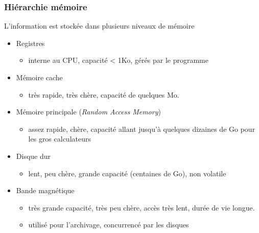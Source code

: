 \begin{frame}
  \frametitle{Hiérarchie mémoire}
  L'information est stockée dans plusieurs niveaux de mémoire
  \begin{itemize}
  \item \alert{Registres}
    \begin{itemize}
    \item interne au CPU, capacité < 1Ko, gérés par le programme
    \end{itemize}
  \item \alert{Mémoire cache}
    \begin{itemize}
    \item très rapide, très chère, capacité de quelques Mo. 
    \end{itemize}
  \item \alert{Mémoire principale} (\emph{Random Access Memory})
    \begin{itemize}
    \item assez rapide, chère, capacité allant jusqu'à quelques dizaines de
      Go pour les gros calculateurs  
    \end{itemize}
  \item \alert{Disque dur}
    \begin{itemize}
    \item lent, peu chère, grande capacité (centaines de Go), non volatile 
    \end{itemize}
  \item \alert{Bande magnétique}
    \begin{itemize}
    \item très grande capacité, très peu chère, accès très
      lent, durée de vie longue. 
    \item utilisé pour l'archivage, concurrencé par les disques 
    \end{itemize}
  \end{itemize}
\end{frame}

